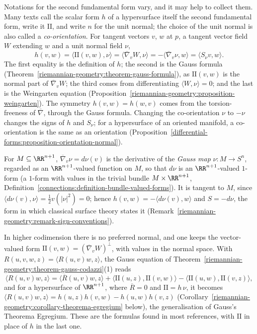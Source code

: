 \begin{remark}\label{riemannian-geometry:remark-second-fundamental-form-notation}
Notations for the second fundamental form vary, and it may help to collect them. Many texts call the scalar form $h$ of a hypersurface itself the second fundamental form, write it $\mathrm{II}$, and
write $n$ for the unit normal; the choice of the unit normal is also called a \emph{co-orientation}. For tangent vectors $v$, $w$ at $p$, a tangent vector field $W$ extending $w$ and a unit normal field $\nu$,
\[
h(v, w) = \langle\mathrm{II}(v, w), \nu\rangle = \langle\overline{\nabla}_vW, \nu\rangle = -\langle\overline{\nabla}_v\nu, w\rangle = \langle S_\nu v, w\rangle .
\]
The first equality is the definition of $h$; the second is the Gauss formula (Theorem~\ref{riemannian-geometry:theorem-gauss-formula}), as $\mathrm{II}(v, w)$ is the normal part of $\overline{\nabla}_vW$; the third comes from
differentiating $\langle W, \nu\rangle = 0$; and the last is the Weingarten equation (Proposition~\ref{riemannian-geometry:proposition-weingarten}). The symmetry $h(v, w) = h(w, v)$ comes from the torsion-freeness of
$\overline{\nabla}$, through the Gauss formula. Changing the co-orientation $\nu$ to $-\nu$ changes the signs of $h$ and $S_\nu$; for a hypersurface of an oriented manifold, a co-orientation is the same as an
orientation (Proposition~\ref{differential-forms:proposition-orientation-normal}).

For $M \subseteq \RR^{n+1}$, $\overline{\nabla}_v\nu = d\nu(v)$ is the derivative of the \emph{Gauss map} $\nu \colon M \to S^n$, regarded as an $\RR^{n+1}$-valued function on $M$, so that $d\nu$ is an
$\RR^{n+1}$-valued $1$-form (a $1$-form with values in the trivial bundle $M \times \RR^{n+1}$, Definition~\ref{connections:definition-bundle-valued-forms}). It is tangent to $M$, since
$\langle d\nu(v), \nu\rangle = \frac12v(|\nu|^2) = 0$; hence $h(v, w) = -\langle d\nu(v), w\rangle$ and $S = -d\nu$, the form in which classical surface theory states it
(Remark~\ref{riemannian-geometry:remark-sign-conventions}).

In higher codimension there is no preferred normal, and one keeps the vector-valued form $\mathrm{II}(v, w) = (\overline{\nabla}_vW)^\perp$, with values in the normal space. With $R(u, v, w, z) = \langle R(u, v)w, z\rangle$, the
Gauss equation of Theorem~\ref{riemannian-geometry:theorem-gauss-codazzi}(1) reads
\[
\langle R(u, v)w, z\rangle = \langle\overline{R}(u, v)w, z\rangle + \langle\mathrm{II}(u, z), \mathrm{II}(v, w)\rangle - \langle\mathrm{II}(u, w), \mathrm{II}(v, z)\rangle,
\]
and for a hypersurface of $\RR^{n+1}$, where $\overline{R} = 0$ and $\mathrm{II} = h\,\nu$, it becomes $\langle R(u, v)w, z\rangle = h(u, z)h(v, w) - h(u, w)h(v, z)$
(Corollary~\ref{riemannian-geometry:corollary-theorema-egregium} below), the generalisation of Gauss's Theorema Egregium. These are the formulas found in most references, with $\mathrm{II}$ in place of $h$ in the
last one.
\end{remark}

